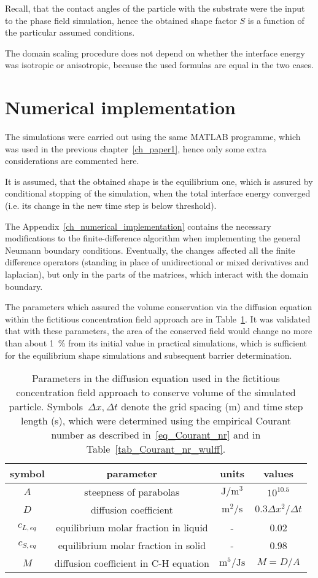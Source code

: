 Recall, that the contact angles of the particle with the substrate were the input to the phase field simulation, hence the obtained shape factor $S$ is a function of the particular assumed conditions. 

The domain scaling procedure does not depend on whether the interface energy was isotropic or anisotropic, because the used formulas are equal in the two cases.

\section{Numerical implementation}
The simulations were carried out using the same MATLAB programme, which was used in the previous chapter~\ref{ch_paper1}, hence only some extra considerations are commented here.

It is assumed, that the obtained shape is the equilibrium one, which is assured by conditional stopping of the simulation, when the total interface energy converged (i.e. its change in the new time step is below threshold). 

The Appendix~\ref{ch_numerical_implementation} contains the necessary modifications to the finite-difference algorithm when implementing the general Neumann boundary conditions. Eventually, the changes affected all the finite difference operators (standing in place of unidirectional or mixed derivatives and laplacian), but only in the parts of the matrices, which interact with the domain boundary.

The parameters which assured the volume conservation via the diffusion equation within the fictitious concentration field approach are in Table~\ref{tab_VC_cc_parameters}. It was validated that with these parameters, the area of the conserved field would change no more than about 1~\% from its initial value in practical simulations, which is sufficient for the equilibrium shape simulations and subsequent barrier determination.

\begin{table}[]
	\centering
	\caption{Parameters in the diffusion equation used in the fictitious concentration field approach to conserve volume of the simulated particle. Symbols~$\Delta x,\Delta t$ denote the grid spacing (\unit{\m}) and time step length (\unit{\s}), which were determined using the empirical Courant number as described in~\eqref{eq_Courant_nr} and in Table~\ref{tab_Courant_nr_wulff}.}
	\begin{tabular}{c|c|c|c}
		symbol & parameter & units & values  \\ \hline
		$A$ & steepness of parabolas & $\mathrm{J/m^3}$ & $10^{10.5}$ \\
		$D$ & diffusion coefficient & $\mathrm{m^2/s}$ & $0.3\Delta x^2/\Delta t$ \\
		$c_{L,eq}$ & equilibrium molar fraction in liquid & - & 0.02 \\
		$c_{S,eq}$ & equilibrium molar fraction in solid & - & 0.98 \\
		$M$ & diffusion coefficient in C-H equation & $\mathrm{m^5/Js}$ & $M=D/A$
	\end{tabular}
	\label{tab_VC_cc_parameters}
\end{table}

